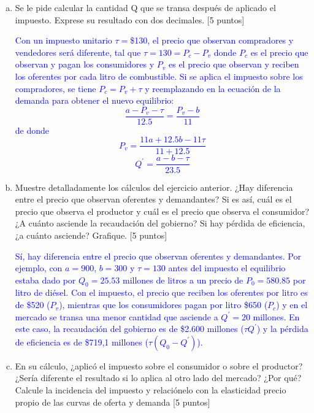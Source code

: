 \documentclass[11pt,letterpaper]{article}
\begin{document}
\begin{enumerate}[a)]

\item Se le pide calcular la cantidad Q que se transa después de aplicado el impuesto. Exprese su resultado con dos decimales. [5 puntos]

\textcolor{blue}{Con un impuesto unitario $\tau=$\$130, el precio que observan compradores y vendedores será diferente, tal que $\tau=130=P_c - P_v$ donde $P_c$ es el precio que observan y pagan los consumidores y $P_v$ es el precio que observan y reciben los oferentes por cada litro de combustible. Si se aplica el impuesto sobre los compradores, se tiene $P_c= P_v+\tau$ y reemplazando en la ecuación de la demanda para obtener el nuevo equilibrio:
$$ \frac{a-P_v-\tau}{12.5}=\frac{P_v-b}{11}$$
de donde $$P_v = \frac{11a+12.5b-11\tau}{11+12.5}$$
$$Q^\prime=\frac{a-b-\tau}{23.5}$$
}

\item  Muestre detalladamente los cálculos del ejercicio anterior. ¿Hay diferencia entre el precio que observan oferentes y demandantes? Si es así, cuál es el precio que observa el productor y cuál es el precio que observa el consumidor? ¿A cuánto asciende la recaudación del gobierno? Si hay pérdida de eficiencia, ¿a cuánto asciende? Grafique. [5 puntos]

\textcolor{blue}{Sí, hay diferencia entre el precio que observan oferentes y demandantes. Por ejemplo, con $a=900$, $b=300$ y $\tau=130$ antes del impuesto el equilibrio estaba dado por $Q_0=25.53$ millones de litros a un precio de $P_0=580.85$ por litro de diésel.  Con el impuesto, el precio que reciben los oferentes por litro es de \$520 ($P_v$), mientras que los consumidores pagan por litro  \$650 ($P_c$) y en el mercado se transa una menor cantidad que asciende a $Q^\prime = 20$ millones. En este caso, la recaudación del gobierno es de \$2.600 millones ($\tau Q^\prime$) y la pérdida de eficiencia es de \$719,1 millones ($\tau (Q_0-Q^\prime)$).
}

\item En su cálculo, ¿aplicó el impuesto sobre el consumidor o sobre el productor? ¿Sería diferente el resultado si lo aplica al otro lado del mercado? ¿Por qué? Calcule la incidencia del impuesto y relaciónelo con la elasticidad precio propio de las curvas de oferta y demanda [5 puntos]


\end{enumerate}
\end{document}
